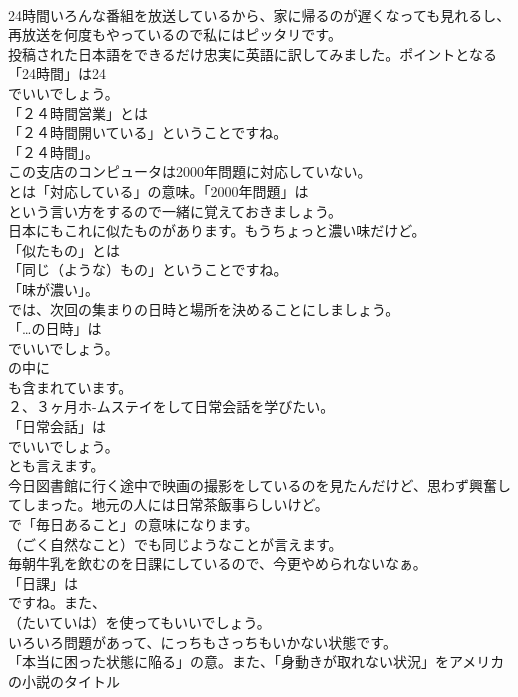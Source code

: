 \documentclass[8pt]{extreport}
\begin{document}
\begin{CJK}{UTF8}{min}
\\	24時間いろんな番組を放送しているから、家に帰るのが遅くなっても見れるし、再放送を何度もやっているので私にはピッタリです。 
\\	投稿された日本語をできるだけ忠実に英語に訳してみました。ポイントとなる「24時間」は24 
\\	でいいでしょう。	
\\	「２４時間営業」とは
\\	「２４時間開いている」ということですね。
\\	「２４時間」。	
\\	この支店のコンピュータは2000年問題に対応していない。 
\\	とは「対応している」の意味。「2000年問題」は
\\	という言い方をするので一緒に覚えておきましょう。	
\\	日本にもこれに似たものがあります。もうちょっと濃い味だけど。 
\\	「似たもの」とは
\\	「同じ（ような）もの」ということですね。
\\	「味が濃い」。	
\\	では、次回の集まりの日時と場所を決めることにしましょう。 
\\	「…の日時」は
\\	でいいでしょう。
\\	の中に
\\	も含まれています。	
\\	２、３ヶ月ホ-ムステイをして日常会話を学びたい。 
\\	「日常会話」は
\\	でいいでしょう。
\\	とも言えます。	
\\	今日図書館に行く途中で映画の撮影をしているのを見たんだけど、思わず興奮してしまった。地元の人には日常茶飯事らしいけど。 
\\	で「毎日あること」の意味になります。
\\	（ごく自然なこと）でも同じようなことが言えます。	
\\	毎朝牛乳を飲むのを日課にしているので、今更やめられないなぁ。 
\\	「日課」は
\\	ですね。また、
\\	（たいていは）を使ってもいいでしょう。	
\\	いろいろ問題があって、にっちもさっちもいかない状態です。 
\\	「本当に困った状態に陥る」の意。また、「身動きが取れない状況」をアメリカの小説のタイトル 

\end{CJK}
\end{document}
